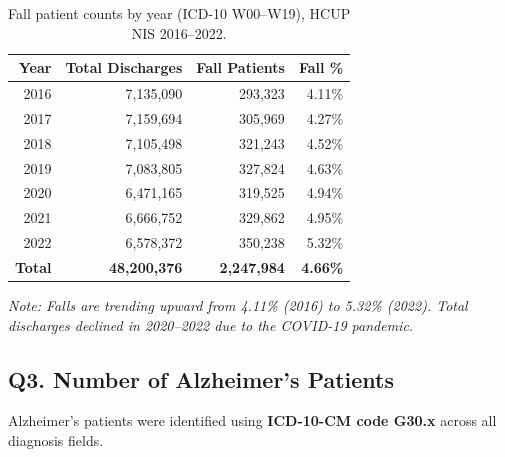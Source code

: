 \documentclass[11pt, a4paper]{article}
\begin{document}
\vspace{6pt}

\begin{table}[H]
\centering
\renewcommand{\arraystretch}{1.3}
\begin{tabular}{rrrr}
\toprule
\textbf{Year} & \textbf{Total Discharges} & \textbf{Fall Patients} & \textbf{Fall \%} \\
\midrule
2016 & 7,135,090 & 293,323 & 4.11\% \\
2017 & 7,159,694 & 305,969 & 4.27\% \\
2018 & 7,105,498 & 321,243 & 4.52\% \\
2019 & 7,083,805 & 327,824 & 4.63\% \\
2020 & 6,471,165 & 319,525 & 4.94\% \\
2021 & 6,666,752 & 329,862 & 4.95\% \\
2022 & 6,578,372 & 350,238 & 5.32\% \\
\midrule
\textbf{Total} & \textbf{48,200,376} & \textbf{2,247,984} & \textbf{4.66\%} \\
\bottomrule
\end{tabular}
\caption{Fall patient counts by year (ICD-10 W00--W19), HCUP NIS 2016--2022.}
\end{table}

\noindent\textit{Note: Falls are trending upward from 4.11\% (2016) to 5.32\% (2022). Total discharges declined in 2020--2022 due to the COVID-19 pandemic.}

\vspace{6pt}

\subsection*{Q3. Number of Alzheimer's Patients}
\begin{answerbox}
Alzheimer's patients were identified using \textbf{ICD-10-CM code G30.x} across all diagnosis fields.
\end{answerbox}

\vspace{6pt}
\end{document}

